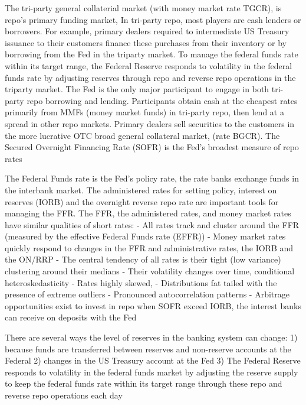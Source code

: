 \documentclass[
]{article}
\begin{document}
The tri-party general collaterial market (with money market rate TGCR), is repo's primary funding market, In tri-party repo, most players are cash lenders or borrowers. For example, primary dealers required to intermediate US Treasury issuance to their customers finance these purchases from their inventory or by borrowing from the Fed in the triparty market. To manage the federal funds rate within its target range, the Federal Reserve responds to volatility in the federal funds rate by adjusting reserves through repo and reverse repo operations in the triparty market. The Fed is the only major participant to engage in both tri-party repo borrowing and lending. Participants obtain cash at the cheapest rates primarily from MMFs (money market funds) in tri-party repo, then lend at a spread in other repo markets. Primary dealers sell securities to the customers in the more lucrative OTC broad general collateral market, (rate BGCR). The Secured Overnight Financing Rate (SOFR) is the Fed's broadest measure of repo rates

The Federal Funds rate is the Fed's policy rate, the rate banks exchange funds in the interbank market. The administered rates for setting policy, interest on reserves (IORB) and the overnight reverse repo rate are important tools for managing the FFR. The FFR, the administered rates, and money market rates have similar qualities of short rates:
- All rates track and cluster around the FFR (measured by the effective Federal Funds rate (EFFR))
- Money market rates quickly respond to changes in the FFR and administrative rates, the IORB and the ON/RRP
- The central tendency of all rates is their tight (low variance) clustering around their medians
- Their volatility changes over time, conditional heteroskedasticity
- Rates highly skewed,
- Distributions fat tailed with the presence of extreme outliers
- Pronounced autocorrelation patterns
- Arbitrage opportunities exist to invest in repo when SOFR exceed IORB, the interest banks can receive on deposits with the Fed

There are several ways the level of reserves in the banking system can change:
1) because funds are transferred between reserves and non-reserve accounts at the Federal
2) changes in the US Treasury account at the Fed
3) The Federal Reserve responds to volatility in the federal funds market by adjusting the reserve
supply to keep the federal funds rate within its target range through these repo and reverse repo operations each day
\end{document}
